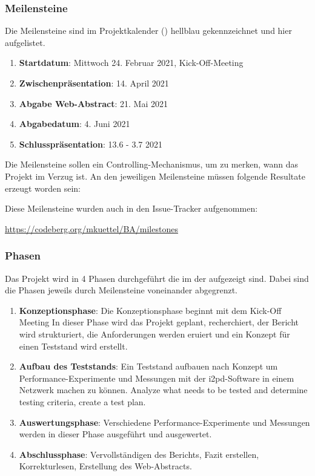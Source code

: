 
\subsubsection{Meilensteine}
\label{sec:meilensteine}

Die Meilensteine sind im Projektkalender () hellblau gekennzeichnet und hier aufgelistet.

\begin{enumerate}
    \item \textbf{Startdatum}: Mittwoch 24. Februar 2021, Kick-Off-Meeting
    \item \textbf{Zwischenpräsentation}: 14. April 2021
    \item \textbf{Abgabe Web-Abstract}: 21. Mai 2021
    \item \textbf{Abgabedatum}: 4. Juni 2021
    \item \textbf{Schlusspräsentation}: 13.6 - 3.7 2021
\end{enumerate}

Die Meilensteine sollen ein Controlling-Mechanismus, um zu merken, wann das Projekt im Verzug ist.
An den jeweiligen Meilensteine müssen folgende Resultate erzeugt worden sein:


Diese Meilensteine wurden auch in den Issue-Tracker aufgenommen:

\url{https://codeberg.org/mkuettel/BA/milestones}

\subsubsection{Phasen}
\label{sec:phasen}

Das Projekt wird in 4 Phasen durchgeführt die im der  aufgezeigt sind.
Dabei sind die Phasen jeweils durch Meilensteine voneinander abgegrenzt.

\begin{enumerate}
    \item \textbf{Konzeptionsphase}: Die Konzeptionsphase beginnt mit dem Kick-Off Meeting
        In dieser Phase wird das Projekt geplant, recherchiert, der Bericht wird strukturiert, die Anforderungen werden eruiert und  ein Konzept für einen Teststand wird erstellt.
    \item \textbf{Aufbau des Teststands}: Ein Teststand aufbauen nach Konzept um Performance-Experimente und Messungen mit der i2pd-Software in einem Netzwerk machen zu können.
Analyze what needs to be tested and determine testing criteria, create a test plan.
    \item \textbf{Auswertungsphase}: Verschiedene Performance-Experimente und Messungen werden in dieser Phase ausgeführt und ausgewertet.
    \item \textbf{Abschlussphase}: Vervollständigen des Berichts, Fazit erstellen, Korrekturlesen, Erstellung des Web-Abstracts.
\end{enumerate}



